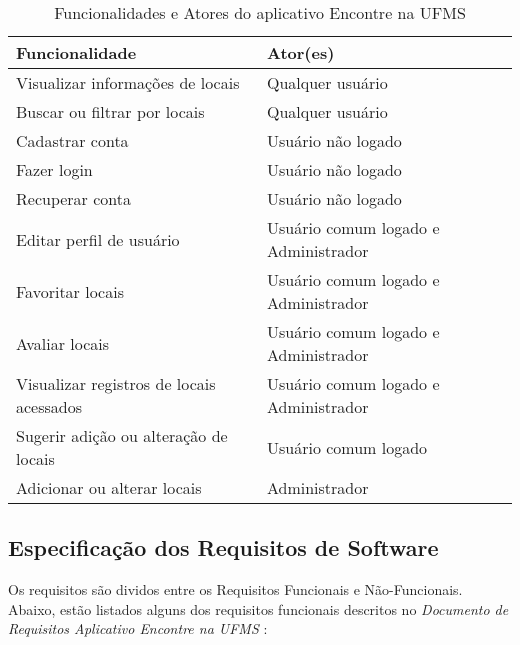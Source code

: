     \begin{table}[h]
        \begin{tabularx}{\textwidth}{|X|X|}
            \hline
            \textbf{Funcionalidade} & \textbf{Ator(es)} \\ \hline
            Visualizar informações de locais & Qualquer usuário \\ \hline
            Buscar ou filtrar por locais & Qualquer usuário \\ \hline
            Cadastrar conta & Usuário não logado \\ \hline
            Fazer login & Usuário não logado \\ \hline
            Recuperar conta & Usuário não logado \\ \hline
            Editar perfil de usuário & Usuário comum logado e Administrador \\ \hline
            Favoritar locais & Usuário comum logado e Administrador \\ \hline
            Avaliar locais & Usuário comum logado e Administrador \\ \hline
            Visualizar registros de locais acessados & Usuário comum logado e Administrador \\ \hline
            Sugerir adição ou alteração de locais & Usuário comum logado \\ \hline
            Adicionar ou alterar locais & Administrador \\ \hline
        \end{tabularx}
        \caption{Funcionalidades e Atores do aplicativo Encontre na UFMS}
        \label{tab:funcionalidades-atores}
    \end{table}
    \FloatBarrier
    
\subsection{Especificação dos Requisitos de Software}

    Os requisitos são dividos entre os Requisitos Funcionais e Não-Funcionais. Abaixo, estão listados alguns dos requisitos funcionais descritos no \textit{Documento de Requisitos Aplicativo Encontre na UFMS} \cite{documentoRequisitosAplicativoEncontreNaUFMS}:
    
